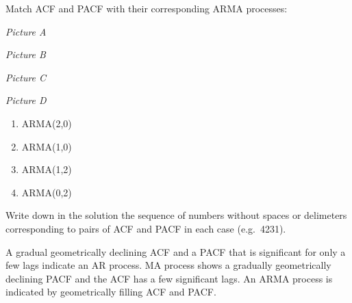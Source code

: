 
\begin{question}
Match ACF and PACF with their corresponding ARMA processes:

\textit{Picture A}

\textit{Picture B}

\textit{Picture C}

\textit{Picture D}

\begin{enumerate}
\def\labelenumi{\arabic{enumi}.}
\item
  ARMA(2,0)
\item
  ARMA(1,0)
\item
  ARMA(1,2)
\item
  ARMA(0,2)
\end{enumerate}

Write down in the solution the sequence of numbers without spaces or delimeters corresponding to pairs of ACF and PACF in each case (e.g.~4231).
\end{question}

\begin{solution}
A gradual geometrically declining ACF and a PACF that is significant for only a few lags indicate an AR process. MA process shows a gradually geometrically declining PACF and the ACF has a few significant lags. An ARMA process is indicated by geometrically filling ACF and PACF.
\end{solution}

